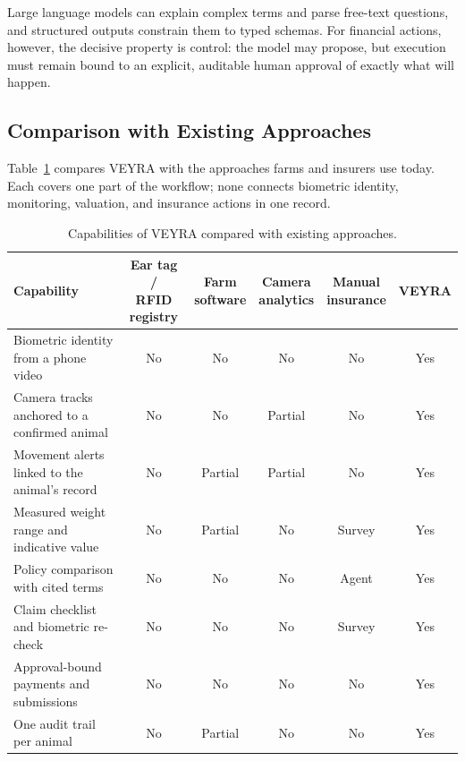 \documentclass[11pt,letterpaper]{article}
\newcommand{\cmark}{Yes}
\newcommand{\xmark}{No}
\begin{document}
Large language models can explain complex terms and parse free-text questions, and structured outputs constrain them to typed schemas. For financial actions, however, the decisive property is control: the model may propose, but execution must remain bound to an explicit, auditable human approval of exactly what will happen.

\subsection{Comparison with Existing Approaches}

Table~\ref{tab:compare} compares VEYRA with the approaches farms and insurers use today. Each covers one part of the workflow; none connects biometric identity, monitoring, valuation, and insurance actions in one record.

\begin{table}[H]
\centering
\caption{Capabilities of VEYRA compared with existing approaches.}
\label{tab:compare}
\footnotesize
\setlength{\tabcolsep}{4pt}
\begin{tabularx}{\textwidth}{>{\raggedright\arraybackslash}Xccccc}
\toprule
Capability & \makecell{Ear tag /\\RFID registry} & \makecell{Farm\\software} & \makecell{Camera\\analytics} & \makecell{Manual\\insurance} & VEYRA \\
\midrule
Biometric identity from a phone video & \xmark & \xmark & \xmark & \xmark & \cmark \\
Camera tracks anchored to a confirmed animal & \xmark & \xmark & Partial & \xmark & \cmark \\
Movement alerts linked to the animal's record & \xmark & Partial & Partial & \xmark & \cmark \\
Measured weight range and indicative value & \xmark & Partial & \xmark & Survey & \cmark \\
Policy comparison with cited terms & \xmark & \xmark & \xmark & Agent & \cmark \\
Claim checklist and biometric re-check & \xmark & \xmark & \xmark & Survey & \cmark \\
Approval-bound payments and submissions & \xmark & \xmark & \xmark & \xmark & \cmark \\
One audit trail per animal & \xmark & Partial & \xmark & \xmark & \cmark \\
\bottomrule
\end{tabularx}
\end{table}
\end{document}
